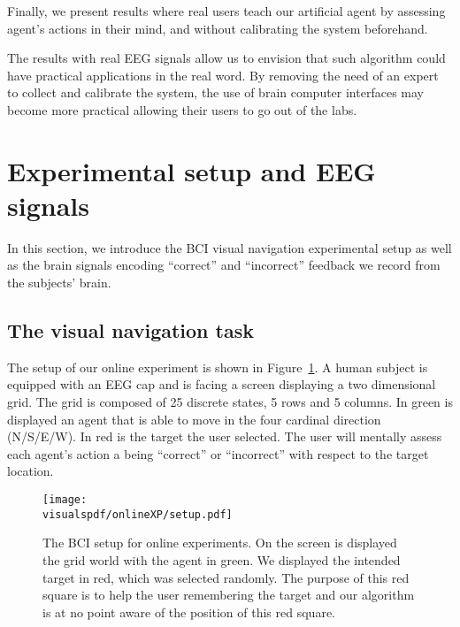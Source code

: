 Finally, we present results where real users teach our artificial agent by assessing agent's actions in their mind, and without calibrating the system beforehand.

The results with real EEG signals allow us to envision that such algorithm could have practical applications in the real word. By removing the need of an expert to collect and calibrate the system, the use of brain computer interfaces may become more practical allowing their users to go out of the labs.

\section{Experimental setup and EEG signals}
\label{chapter:bci:setupandeeg}

In this section, we introduce the BCI visual navigation experimental setup as well as the brain signals encoding ``correct'' and ``incorrect'' feedback we record from the subjects' brain.

\subsection{The visual navigation task}

The setup of our online experiment is shown in Figure~\ref{fig:BCIsetup}. A human subject is equipped with an EEG cap and is facing a screen displaying a two dimensional grid. The grid is composed of 25 discrete states, 5 rows and 5 columns. In green is displayed an agent that is able to move in the four cardinal direction (N/S/E/W). In red is the target the user selected. The user will mentally assess each agent's action a being ``correct'' or ``incorrect'' with respect to the target location.

\begin{figure}[!htbp]
\centering
\texttt{[image: \\visualspdf/onlineXP/setup.pdf]}
\caption{The BCI setup for online experiments. On the screen is displayed the grid world with the agent in green. We displayed the intended target in red, which was selected randomly. The purpose of this red square is to help the user remembering the target and our algorithm is at no point aware of the position of this red square.}
\label{fig:BCIsetup}
\end{figure}

